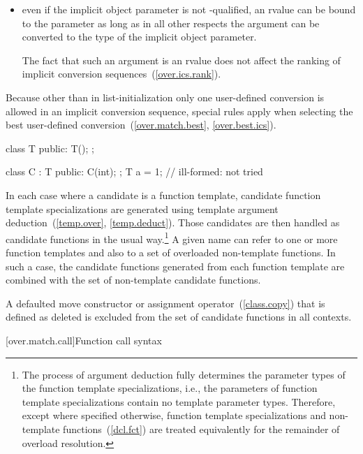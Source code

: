 \begin{itemize}
\item
even if the implicit object parameter is not
-qualified,
an rvalue can be bound to the parameter
as long as in all other respects the argument can be
converted to the type of the implicit object parameter.
\begin{note} The fact that such an argument is an rvalue does not
affect the ranking of implicit conversion sequences~(\ref{over.ics.rank}).
\end{note}
\end{itemize}

\pnum
Because other than in list-initialization only one user-defined conversion
is allowed
in an
implicit conversion sequence, special rules apply when selecting
the best user-defined conversion~(\ref{over.match.best},
\ref{over.best.ics}).
\begin{example}

\begin{codeblock}
class T {
public:
  T();
};

class C : T {
public:
  C(int);
};
T a = 1;            // ill-formed:  not tried
\end{codeblock}
\end{example}

\pnum
In each case where a candidate is a function template, candidate
function template specializations
are generated using template argument deduction~(\ref{temp.over},
\ref{temp.deduct}).
Those candidates are then handled as candidate
functions in the usual way.\footnote{The process of argument deduction fully
determines the parameter types of
the
function template specializations,
i.e., the parameters of
function template specializations
contain
no template parameter types.
Therefore, except where specified otherwise,
function template specializations
and non-template functions~(\ref{dcl.fct}) are treated equivalently
for the remainder of overload resolution.}
A given name can refer to one or more function templates and also
to a set of overloaded non-template functions.
In such a case, the
candidate functions generated from each function template are combined
with the set of non-template candidate functions.

\pnum
A defaulted move constructor or assignment operator~(\ref{class.copy}) that is
defined as deleted is excluded from the set of candidate functions in all
contexts.

[over.match.call]{Function call syntax}%

